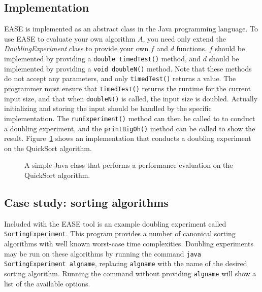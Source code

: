\documentclass[10pt,twocolumn]{article}
\newcommand{\toolname}{{\sc EASE}\xspace}
\begin{document}
    \subsection{Implementation}
    \toolname is implemented as an abstract class in the Java
    programming language.  To use \toolname to evaluate your own
    algorithm $A$, you need only extend the \textit{DoublingExperiment}
    class to provide your own $f$ and $d$ functions.  $f$ should be
    implemented by providing a \lstinline$double timedTest()$ method,
    and $d$ should be implemented by providing a \lstinline$void doubleN()$
    method. Note that these methods do not accept any parameters,
    and only \lstinline$timedTest()$ returns a value. The programmer
    must ensure that \lstinline$timedTest()$ returns the runtime for the
    current input size, and that when \lstinline$doubleN()$ is called,
    the input size is doubled.  Actually initializing and storing the
    input should be handled by the specific implementation. The
    \lstinline$runExperiment()$ method can then be called to to conduct
    a doubling experiment, and the \lstinline$printBigOh()$ method can
    be called to show the result. Figure~\ref{fig:qsprogram} shows an
    implementation that conducts a doubling experiment on the QuickSort
    algorithm.


    
    \begin{figure}[t]
    
    \caption{A simple Java class that performs a performance evaluation
    on the QuickSort algorithm.}
    \label{fig:qsprogram}
    \end{figure}

    \subsection{Case study: sorting algorithms}
    \lstset{language=bash}
    Included with the \toolname tool is an example doubling
    experiment called \texttt{SortingExperiment}.  This program provides a number
    of canonical sorting algorithms with well known worst-case time
    complexities.  Doubling experiments may be run on these algorithms
    by running the command \texttt{java SortingExperiment algname},
    replacing \texttt{algname} with the name of the desired sorting
    algorithm. Running the command without providing \texttt{algname}
    will show a list of the available options.
\end{document}
